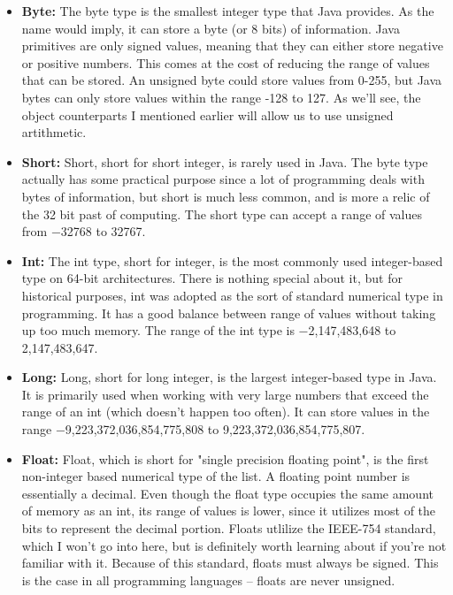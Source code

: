 \documentclass{article}
\begin{document}
\begin{itemize}

\item{%
    \textbf{Byte:} The byte type is the smallest integer type that Java provides. As the name would imply, it
    can store a byte (or 8 bits) of information. Java primitives are only signed values, meaning that they can
    either store negative or positive numbers. This comes at the cost of reducing the range of values that can
    be stored. An unsigned byte could store values from 0-255, but Java bytes can only store values within the
    range -128 to 127. As we’ll see, the object counterparts I mentioned earlier will allow us to use unsigned
    artithmetic.
}

\item{%
    \textbf{Short:} Short, short for short integer, is rarely used in Java. The byte type actually has some
    practical purpose since a lot of programming deals with bytes of information, but short is much less common,
    and is more a relic of the 32 bit past of computing. The short type can accept a range of values from
    −32768 to 32767.
}

\item{%
    \textbf{Int:} The int type, short for integer, is the most commonly used integer-based type on 64-bit
    architectures. There is nothing special about it, but for historical purposes, int was adopted as the sort
    of standard numerical type in programming. It has a good balance between range of values without taking up
    too much memory. The range of the int type is −2,147,483,648 to 2,147,483,647.
}

\item{%
    \textbf{Long:} Long, short for long integer, is the largest integer-based type in Java. It is primarily
    used when working with very large numbers that exceed the range of an int (which doesn’t happen too often).
    It can store values in the range −9,223,372,036,854,775,808 to 9,223,372,036,854,775,807.
}

\item{%
    \textbf{Float:} Float, which is short for "single precision floating point", is the first non-integer
    based numerical type of the list. A floating point number is essentially a decimal. Even though the float
    type occupies the same amount of memory as an int, its range of values is lower, since it utilizes most of
    the bits to represent the decimal portion. Floats utlilize the IEEE-754 standard, which I won’t go into
    here, but is definitely worth learning about if you’re not familiar with it. Because of this standard,
    floats must always be signed. This is the case in all programming languages – floats are never unsigned.
}


\end{itemize}
\end{document}
